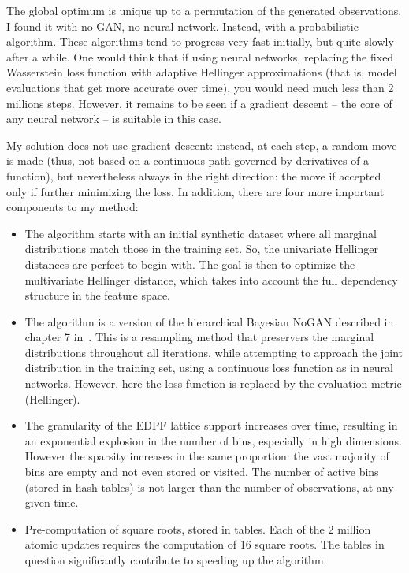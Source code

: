\documentclass[oneside,10pt]{book}
\begin{document}
\noindent The global optimum is unique up to a permutation of the generated observations. I found it with no GAN, no neural network. Instead, with a
 probabilistic algorithm. These algorithms tend to progress very fast initially, but quite slowly after a while. One would think that
 if using neural networks, replacing the fixed Wasserstein loss function with adaptive Hellinger approximations (that is, model evaluations that get more accurate over time), 
 you would need much less than 2 millions steps. However, it remains to be seen if a gradient descent -- the core of any neural network -- is suitable in this case. 

My
 solution does not use gradient descent: instead, at each step, a random move is made (thus, not based on a continuous path governed by derivatives of a function), but 
 nevertheless always in the right direction: the move if accepted only if further minimizing the loss.  In addition, there are four more important components to my method:
\vspace{1ex}
\begin{itemize}
\item The algorithm starts with an initial  synthetic dataset where all marginal distributions match those in the training set. So, the univariate Hellinger distances
 are perfect to begin with. The goal is then to optimize the multivariate Hellinger distance, which takes into account the full dependency structure
 in the feature space. 
\item The algorithm is a version of the hierarchical Bayesian \textcolor{index}{NoGAN} described in chapter 7 in~\cite{vgmloptim}. This is
 a resampling method that preservers the marginal distributions throughout all iterations, while attempting to approach the joint distribution in the training set, using a continuous
 loss function as in neural networks. However, here the loss function is replaced by the evaluation metric (Hellinger). 
\item The granularity of the EDPF lattice support increases over time, resulting in an exponential explosion in the number of bins, especially in high dimensions. 
However the sparsity increases in the same proportion: the vast majority of bins are empty and not even stored or visited. The number of active bins (stored in hash tables) is not larger
 than the number of observations, at any given time. 
\item Pre-computation of square roots, stored in tables.  Each of the 2 million atomic updates requires the computation of 16 square roots. The tables in question
significantly contribute to speeding up the algorithm. 
\end{itemize}
\vspace{1ex}
\end{document}
